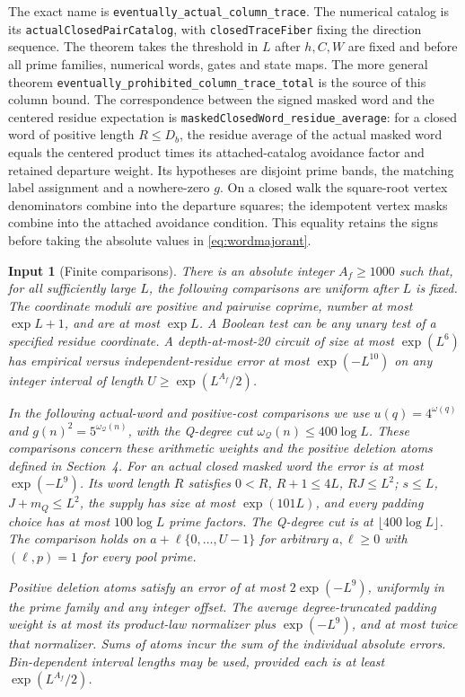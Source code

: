 \documentclass[11pt]{article}
\newtheorem{inputthm}[theorem]{Input}
\theoremstyle{definition}
\newcommand{\leanname}[1]{\nolinkurl{#1}}
\begin{document}
The exact name is \leanname{eventually_actual_column_trace}.
The numerical catalog is its \leanname{actualClosedPairCatalog}, with
\leanname{closedTraceFiber} fixing the direction sequence.
The theorem takes the threshold in $L$ after $h,C,W$ are fixed and
before all prime families, numerical words, gates and state maps.
The more general theorem \leanname{eventually_prohibited_column_trace_total}
is the source of this column bound.
The correspondence between the signed masked word and the centered
residue expectation is
\leanname{maskedClosedWord_residue_average}: for a closed word of
positive length $R\le D_b$, the residue average of the actual masked
word equals the centered product times its attached-catalog avoidance
factor and retained departure weight. Its hypotheses are disjoint prime
bands, the matching label assignment and a nowhere-zero $g$.
On a closed walk the square-root vertex denominators combine into the
departure squares; the idempotent vertex masks combine into the attached
avoidance condition. This equality retains the signs before taking the
absolute values in \eqref{eq:wordmajorant}.

\begin{inputthm}[Finite comparisons]\label{input:comparison}
There is an absolute integer $A_f\ge1000$ such that, for all sufficiently
large $L$, the following comparisons are uniform after $L$ is fixed.
The coordinate moduli are positive and pairwise coprime, number at most
$\exp L+1$, and are at most $\exp L$.
A Boolean test can be any unary test of a specified residue coordinate.
A depth-at-most-20 circuit of size at most $\exp(L^6)$ has empirical
versus independent-residue error at most $\exp(-L^{10})$ on any integer
interval of length $U\ge\exp(L^{A_f}/2)$.

In the following actual-word and positive-cost comparisons we use
$u(q)=4^{\omega(q)}$ and $g(n)^2=5^{\omega_{\mathcal Q}(n)}$,
with the Q-degree cut $\omega_{\mathcal Q}(n)\le400\log L$.
These comparisons concern these arithmetic weights and the positive
deletion atoms defined in Section~4.
For an actual closed masked word the error is at most $\exp(-L^9)$.
Its word length $R$ satisfies $0<R$, $R+1\le4L$, $RJ\le L^2$;
$s\le L$, $J+m_Q\le L^2$, the supply has size at most $\exp(101L)$,
and every padding choice has at most $100\log L$ prime factors.
The Q-degree cut is at $\lfloor400\log L\rfloor$.
The comparison holds on $a+\ell\{0,\ldots,U-1\}$ for arbitrary
$a,\ell\ge0$ with $(\ell,p)=1$ for every pool prime.

Positive deletion atoms satisfy an error of at most
$2\exp(-L^9)$, uniformly in the prime family and any integer offset.
The average degree-truncated padding weight is at most its product-law
normalizer plus $\exp(-L^9)$, and at most twice that normalizer.
Sums of atoms incur the sum of the individual absolute errors.
Bin-dependent interval lengths may be used, provided each is at least
$\exp(L^{A_f}/2)$.
\end{inputthm}
\end{document}
